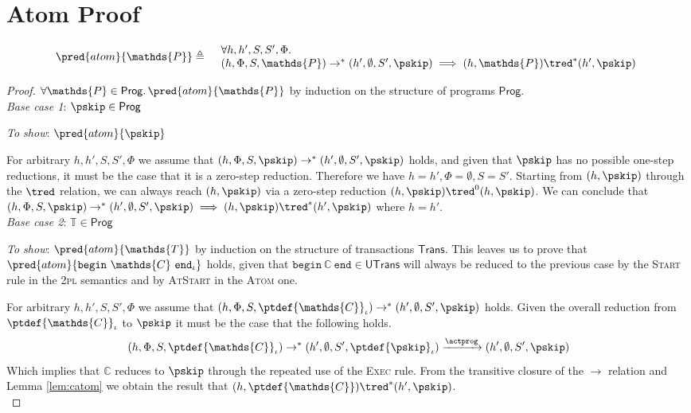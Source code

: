 \section{Atom Proof}

\[
\begin{array}{r l}
	\pred{atom}{\mathds{P}} \triangleq&
	\begin{array}{l}
	\forall h, h', S, S', \Phi \ldotp \\
	(h, \Phi, S, \mathds{P}) \rightarrow^* (h', \emptyset, S', \pskip) \implies 
	(h, \mathds{P}) \tred^* (h', \pskip)
	\end{array}
\end{array}
\]

{\parindent0pt
\begin{proof}
$\forall \mathds{P} \in \mathsf{Prog} \ldotp \pred{atom}{\mathds{P}}$ by induction on the structure of programs $\mathsf{Prog}$. \\

\textit{Base case 1}: $\pskip \in \mathsf{Prog}$

\textit{To show}: $\pred{atom}{\pskip}$

For arbitrary $h, h', S, S', \Phi$ we assume that $(h, \Phi, S, \pskip) \rightarrow^* (h', \emptyset, S', \pskip)$ holds, and given that $\pskip$ has no possible one-step reductions, it must be the case that it is a zero-step reduction. Therefore we have $h = h', \Phi = \emptyset, S = S'$. Starting from $(h, \pskip)$ through the $\tred$ relation, we can always reach $(h, \pskip)$ via a zero-step reduction $(h, \pskip) \tred^0 (h, \pskip)$. We can conclude that $(h, \Phi, S, \pskip) \rightarrow^* (h', \emptyset, S', \pskip) \implies (h, \pskip) \tred^* (h', \pskip)$ where $h = h'$. \\

\textit{Base case 2}: $\mathds{T} \in \mathsf{Prog}$

\textit{To show}: $\pred{atom}{\mathds{T}}$ by induction on the structure of transactions $\mathsf{Trans}$. This leaves us to prove that $\pred{atom}{\mathtt{begin}\ \mathds{C}\ \mathtt{end}_\iota}$ holds, given that $\mathtt{begin}\ \mathds{C}\ \mathtt{end} \in \mathsf{UTrans}$ will always be reduced to the previous case by the \textsc{Start} rule in the \textsc{2pl} semantics and by \textsc{AtStart} in the \textsc{Atom} one.

For arbitrary $h, h', S, S', \Phi$ we assume that $(h, \Phi, S, \ptdef{\mathds{C}}_\iota) \rightarrow^* (h', \emptyset, S', \pskip)$ holds. Given the overall reduction from $\ptdef{\mathds{C}}_\iota$ to $\pskip$ it must be the case that the following holds.
\[
(h, \Phi, S, \ptdef{\mathds{C}}_\iota) \rightarrow^* (h', \emptyset, S', \ptdef{\pskip}_\iota) \xrightarrow{\actprog} (h', \emptyset, S', \pskip)
\]
Which implies that $\mathds{C}$ reduces to $\pskip$ through the repeated use of the \textsc{Exec} rule. From the transitive closure of the $\rightarrow$ relation and Lemma \ref{lem:catom} we obtain the result that $(h, \ptdef{\mathds{C}}) \tred^* (h', \pskip)$. \\


\end{proof}}
